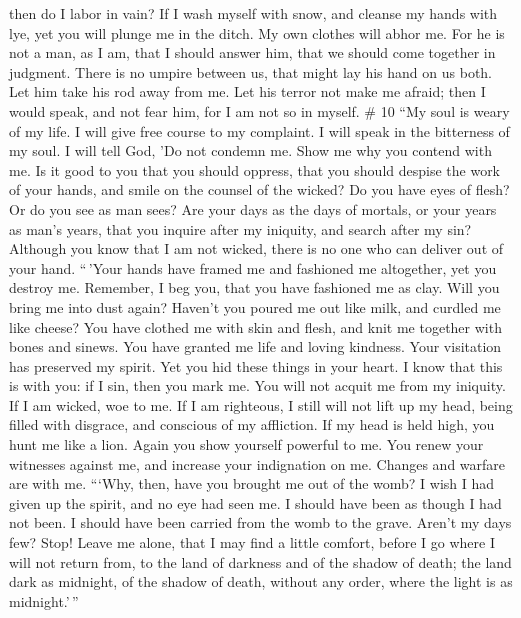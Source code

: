 then do I labor in vain?  If I wash myself with snow, and
cleanse my hands with lye,  yet you will plunge me in the
ditch. My own clothes will abhor me.  For he is not a
man, as I am, that I should answer him, that we should come together in
judgment.  There is no umpire between us, that might lay
his hand on us both.  Let him take his rod away from me.
Let his terror not make me afraid;  then I would speak,
and not fear him, for I am not so in myself. \# 10  ``My
soul is weary of my life. I will give free course to my complaint. I
will speak in the bitterness of my soul.  I will tell God,
'Do not condemn me. Show me why you contend with me.  Is
it good to you that you should oppress, that you should despise the work
of your hands, and smile on the counsel of the wicked?  Do
you have eyes of flesh? Or do you see as man sees?  Are
your days as the days of mortals, or your years as man's years,
 that you inquire after my iniquity, and search after my
sin?  Although you know that I am not wicked, there is no
one who can deliver out of your hand.  ``\,'Your hands
have framed me and fashioned me altogether, yet you destroy me.
 Remember, I beg you, that you have fashioned me as clay.
Will you bring me into dust again?  Haven't you poured me
out like milk, and curdled me like cheese?  You have
clothed me with skin and flesh, and knit me together with bones and
sinews.  You have granted me life and loving kindness.
Your visitation has preserved my spirit.  Yet you hid
these things in your heart. I know that this is with you:
 if I sin, then you mark me. You will not acquit me from
my iniquity.  If I am wicked, woe to me. If I am
righteous, I still will not lift up my head, being filled with disgrace,
and conscious of my affliction.  If my head is held high,
you hunt me like a lion. Again you show yourself powerful to me.
 You renew your witnesses against me, and increase your
indignation on me. Changes and warfare are with me. 
```Why, then, have you brought me out of the womb? I wish I had given up
the spirit, and no eye had seen me.  I should have been
as though I had not been. I should have been carried from the womb to
the grave.  Aren't my days few? Stop! Leave me alone,
that I may find a little comfort,  before I go where I
will not return from, to the land of darkness and of the shadow of
death;  the land dark as midnight, of the shadow of
death, without any order, where the light is as midnight.'\,''

